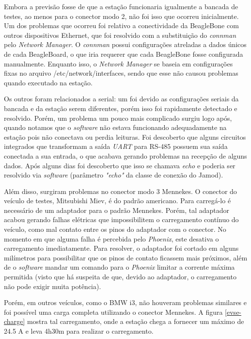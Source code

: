     Embora a previsão fosse de que a estação funcionaria igualmente a bancada de testes, ao menos para o conector modo 2, não foi isso que ocorreu inicialmente. Um dos problemas que ocorreu foi relativo a conectividade da BeagleBone com outros dispositivos Ethernet, que foi resolvido com a substituição do \textit{connman} pelo \textit{Network Manager}. O \textit{connman} possui configurações atreladas a dados únicos de cada BeagleBoard, o que iria requerer que cada BeagleBone fosse configurada manualmente. Enquanto isso, o \textit{Network Manager} se baseia em configurações fixas no arquivo /etc/network/interfaces, sendo que esse não causou problemas quando executado na estação.

    Os outros foram relacionados a serial: um foi devido as configurações seriais da bancada e da estação serem diferentes, porém isso foi rapidamente detectado e resolvido. Porém, um problema um pouco mais complicado surgiu logo após, quando notamos que o \textit{software} não estava funcionando adequadamente na estação pois não conectava ou perdia leituras. Foi descoberto que alguns circuitos integrados que transformam a saída \textit{\ac{UART}} para RS-485 possuem sua saída conectada a sua entrada, o que acabava gerando problemas na recepção de alguns dados. Após alguns dias foi descoberto que isso se chamava \textit{echo} e poderia ser resolvido via \textit{software} (parâmetro \textit{"echo"} da classe de conexão do Jamod).

    Além disso, surgiram problemas no conector modo 3 Mennekes. O conector do veículo de testes, Mitsubishi Miev, é do padrão americano. Para carregá-lo é necessário de um adaptador para o padrão Mennekes. Porém, tal adaptador acabou gerando falhas elétricas que impossibilitem o carregamento contínuo do veículo, como mal contato entre os pinos do adaptador com o conector. No momento em que alguma falha é percebida pelo \textit{Phoenix}, este desativa o carregamento imediatamente. Para resolver, o adaptador foi cortado em alguns milímetros para possibilitar que os pinos de contato ficassem mais próximos, além de o \textit{software} mandar um comando para o \textit{Phoenix} limitar a corrente máxima permitida (visto que há suspeita de que, devido ao adaptador, o carregamento não pode exigir muita potência).

    Porém, em outros veículos, como o BMW i3, não houveram problemas similares e foi possível uma carga completa utilizando o conector Mennekes. A figura \ref{evse-charge} mostra tal carregamento, onde a estação chega a fornecer um máximo de 24.5 A e leva 4h30m para realizar o carregamento.

